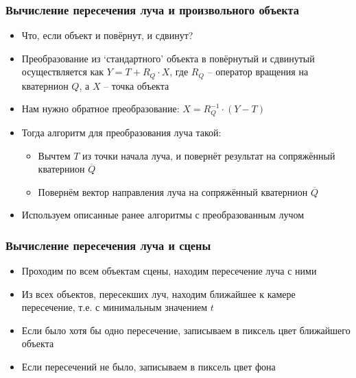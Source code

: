 \documentclass[10pt]{beamer}
\begin{document}
\begin{frame}
\frametitle{Вычисление пересечения луча и произвольного объекта}
\begin{itemize}
\item Что, если объект и повёрнут, и сдвинут?
\pause
\item Преобразование из `стандартного' объекта в повёрнутый и сдвинутый осуществляется как \begin{math}Y = T + R_Q\cdot X\end{math}, где \begin{math}R_Q\end{math} -- оператор вращения на кватернион \begin{math}Q\end{math}, а \begin{math}X\end{math} -- точка объекта
\pause
\item Нам нужно обратное преобразование: \begin{math}X = R_Q^{-1} \cdot (Y - T)\end{math}
\pause
\item Тогда алгоритм для преобразования луча такой:
\pause
\begin{itemize}
\item Вычтем \begin{math}T\end{math} из точки начала луча, и повернёт результат на сопряжённый кватернион \begin{math}\overline{Q}\end{math}
\pause
\item Повернём вектор направления луча на сопряжённый кватернион \begin{math}\overline{Q}\end{math}
\end{itemize}
\pause
\item Используем описанные ранее алгоритмы с преобразованным лучом
\end{itemize}
\end{frame}

\begin{frame}
\frametitle{Вычисление пересечения луча и сцены}
\begin{itemize}
\item Проходим по всем объектам сцены, находим пересечение луча с ними
\pause
\item Из всех объектов, пересекших луч, находим ближайшее к камере пересечение, т.е. с минимальным значением \begin{math}t\end{math}
\pause
\item Если было хотя бы одно пересечение, записываем в пиксель цвет ближайшего объекта
\pause
\item Если пересечений не было, записываем в пиксель цвет фона
\end{itemize}
\end{frame}
\end{document}
